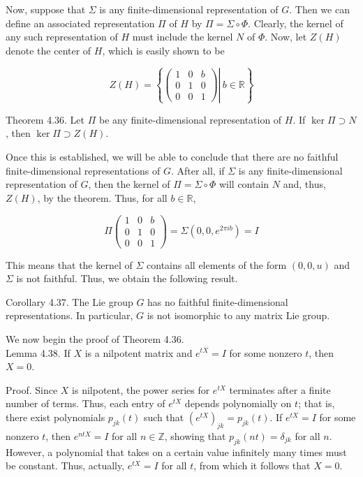 \documentclass[10pt, letterpaper]{article}
\begin{document}
Now, suppose that $\Sigma$ is any finite-dimensional representation of $G$. Then we can define an associated representation $\Pi$ of $H$ by $\Pi=\Sigma \circ \Phi$. Clearly, the kernel of any such representation of $H$ must include the kernel $N$ of $\Phi$. Now, let $Z(H)$ denote the center of $H$, which is easily shown to be

$$
Z(H)=\left\{\left.\left(\begin{array}{lll}
1 & 0 & b \\
0 & 1 & 0 \\
0 & 0 & 1
\end{array}\right) \right\rvert\, b \in \mathbb{R}\right\}
$$

Theorem 4.36. Let $\Pi$ be any finite-dimensional representation of $H$. If $\operatorname{ker} \Pi \supset N$, then $\operatorname{ker} \Pi \supset Z(H)$.

Once this is established, we will be able to conclude that there are no faithful finite-dimensional representations of $G$. After all, if $\Sigma$ is any finite-dimensional representation of $G$, then the kernel of $\Pi=\Sigma \circ \Phi$ will contain $N$ and, thus, $Z(H)$, by the theorem. Thus, for all $b \in \mathbb{R}$,

$$
\Pi\left(\begin{array}{lll}
1 & 0 & b \\
0 & 1 & 0 \\
0 & 0 & 1
\end{array}\right)=\Sigma\left(0,0, e^{2 \pi i b}\right)=I
$$

This means that the kernel of $\Sigma$ contains all elements of the form $(0,0, u)$ and $\Sigma$ is not faithful. Thus, we obtain the following result.

Corollary 4.37. The Lie group $G$ has no faithful finite-dimensional representations. In particular, $G$ is not isomorphic to any matrix Lie group.

We now begin the proof of Theorem 4.36.\\
Lemma 4.38. If $X$ is a nilpotent matrix and $e^{t X}=I$ for some nonzero $t$, then $X=0$.

Proof. Since $X$ is nilpotent, the power series for $e^{t X}$ terminates after a finite number of terms. Thus, each entry of $e^{t X}$ depends polynomially on $t$; that is, there exist polynomials $p_{j k}(t)$ such that $\left(e^{t X}\right)_{j k}=p_{j k}(t)$. If $e^{t X}=I$ for some nonzero $t$, then $e^{n t X}=I$ for all $n \in \mathbb{Z}$, showing that $p_{j k}(n t)=\delta_{j k}$ for all $n$. However, a polynomial that takes on a certain value infinitely many times must be constant. Thus, actually, $e^{t X}=I$ for all $t$, from which it follows that $X=0$.
\end{document}
